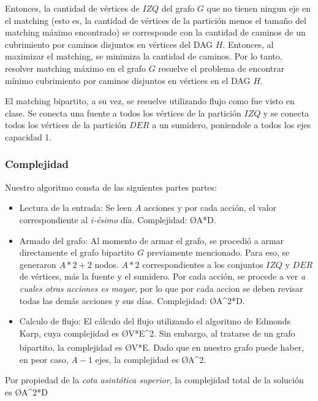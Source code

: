 Entonces, la cantidad de vértices de $IZQ$ del grafo $G$ que no tienen ningun eje en el matching (esto es, la cantidad de vértices de la partición menos el tamaño del matching máximo encontrado) se corresponde con la cantidad de caminos de un cubrimiento por caminos disjuntos en vértices del DAG $H$. Entonces, al maximizar el matching, se minimiza la cantidad de caminos. Por lo tanto, resolver matching máximo en el grafo $G$ resuelve el problema de encontrar mínimo cubrimiento por caminos disjuntos en vértices en el DAG $H$.

El matching bipartito, a su vez, se resuelve utilizando flujo como fue visto en clase. Se conecta una fuente a todos los vértices de la partición $IZQ$ y se conecta todos los vértices de la partición $DER$ a un sumidero, poniendole a todos los ejes capacidad 1.

\subsubsection{Complejidad}
Nuestro algoritmo consta de las siguientes partes partes:
\begin{itemize}
	\item Lectura de la entrada: Se leen $A$ acciones y por cada acción, el valor correspondiente al \emph{i-ésimo} día. Complejidad: \O{A*D}.
	\item Armado del grafo: Al momento de armar el grafo, se procedió a armar directamente el grafo bipartito $G$ previamente mencionado. Para eso, se generaron $A*2+2$ nodos. $A*2$ correspondientes a los conjuntos $IZQ$ y $DER$ de vértices, más la fuente y el sumidero. Por cada acción, se procede a ver \emph{a cuales otras acciones es mayor}, por lo que por cada accion se deben revisar todas las demás acciones y sus días. Complejidad: \O{A^2*D}.
	\item Calculo de flujo: El cálculo del flujo utilizando el algoritmo de Edmonds Karp, cuya complejidad es \O{V*E^2}. Sin embargo, al tratarse de un grafo bipartito, la complejidad es \O{V*E}\textsuperscript{\cite{cormen}}. Dado que en nuestro grafo puede haber, en peor caso, $A-1$ ejes, la complejidad es \O{A^2}.
\end{itemize}

Por propiedad de la \emph{cota asintótica superior}, la complejidad total de la solución es \O{A^2*D}